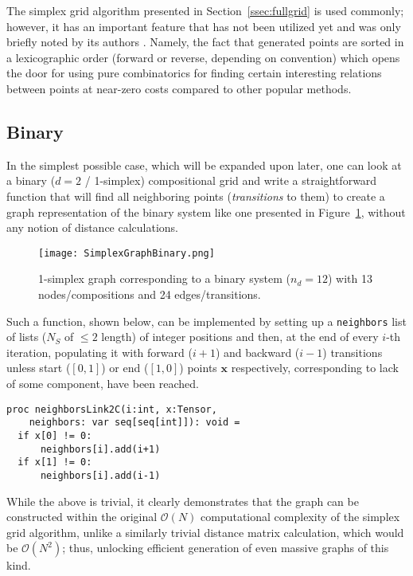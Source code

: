 The simplex grid algorithm presented in Section~\ref{ssec:fullgrid} is used commonly; however, it has an important feature that has not been utilized yet and was only briefly noted by its authors \cite{Chasalow1995AlgorithmPoints}. Namely, the fact that generated points are sorted in a lexicographic order (forward or reverse, depending on convention) which opens the door for using pure combinatorics for finding certain interesting relations between points at near-zero costs compared to other popular methods.

\subsection{Binary} \label{ssec:binarygraph}

In the simplest possible case, which will be expanded upon later, one can look at a binary ($d=2$ / 1-simplex) compositional grid and write a straightforward function that will find all neighboring points (\emph{transitions} to them) to create a graph representation of the binary system like one presented in Figure~\ref{fig:binarysimplexgraph}, without any notion of distance calculations.

\begin{figure}[H]
    \centering
    \texttt{[image: SimplexGraphBinary.png]}
    \caption{1-simplex graph corresponding to a binary system ($n_d=12$) with 13 nodes/compositions and 24 edges/transitions.} 
    \label{fig:binarysimplexgraph}
\end{figure}

Such a function, shown below, can be implemented by setting up a \texttt{neighbors} list of lists ($N_S$ of $\leq2$ length) of integer positions and then, at the end of every $i$-th iteration, populating it with forward ($i+1$) and backward ($i-1$) transitions unless start ($[0,1]$) or end ($[1,0]$) points $\textbf{x}$ respectively, corresponding to lack of some component, have been reached.


\begin{verbatim}
proc neighborsLink2C(i:int, x:Tensor, 
    neighbors: var seq[seq[int]]): void =
  if x[0] != 0:
      neighbors[i].add(i+1)
  if x[1] != 0:
      neighbors[i].add(i-1)
\end{verbatim}

While the above is trivial, it clearly demonstrates that the graph can be constructed within the original $\mathcal{O}(N)$ computational complexity of the simplex grid algorithm, unlike a similarly trivial distance matrix calculation, which would be $\mathcal{O}(N^2)$; thus, unlocking efficient generation of even massive graphs of this kind.

